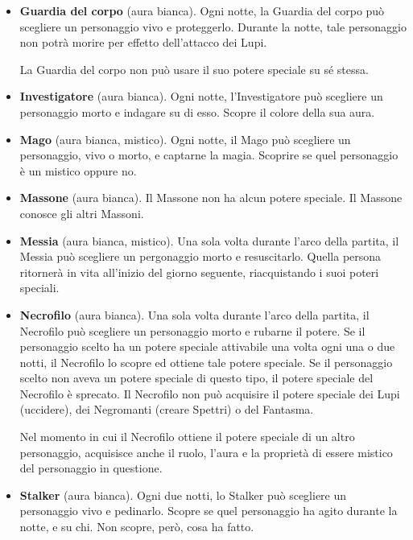 \documentclass[a4paper,10pt]{article}
\begin{document}
\begin{itemize}
 \item {\bf Guardia del corpo} (aura bianca). Ogni notte, la Guardia del corpo può scegliere un personaggio vivo e proteggerlo. Durante la notte, tale personaggio non potrà morire per effetto dell'attacco dei Lupi.
 
 La Guardia del corpo non può usare il suo potere speciale su sé stessa.
 
 \item {\bf Investigatore} (aura bianca). Ogni notte, l'Investigatore può scegliere un personaggio morto e indagare su di esso. Scopre il colore della sua aura.

 \item {\bf Mago} (aura bianca, mistico). Ogni notte, il Mago può scegliere un personaggio, vivo o morto, e captarne la magia. Scoprire se quel personaggio è un mistico oppure no.
 
 \item {\bf Massone} (aura bianca). Il Massone non ha alcun potere speciale. Il Massone conosce gli altri Massoni.
 
 \item {\bf Messia} (aura bianca, mistico). Una sola volta durante l'arco della partita, il Messia può scegliere un pergonaggio morto e resuscitarlo. Quella persona ritornerà in vita all'inizio del giorno seguente, riacquistando i suoi poteri speciali.


 \item {\bf Necrofilo} (aura bianca). Una sola volta durante l'arco della partita, il Necrofilo può scegliere un personaggio morto e rubarne il potere. 
 Se il personaggio scelto ha un potere speciale attivabile una volta ogni una o due notti, il Necrofilo lo scopre ed ottiene tale potere speciale.
 Se il personaggio scelto non aveva un potere speciale di questo tipo, il potere speciale del Necrofilo è sprecato.
 Il Necrofilo non può acquisire il potere speciale dei Lupi (uccidere), dei Negromanti (creare Spettri) o del Fantasma.
 
 Nel momento in cui il Necrofilo ottiene il potere speciale di un altro personaggio, acquisisce anche il ruolo, l'aura e la proprietà di essere mistico del personaggio in questione.

 \item {\bf Stalker} (aura bianca). Ogni due notti, lo Stalker può scegliere un personaggio vivo e pedinarlo. Scopre se quel personaggio ha agito durante la notte, e su chi. Non scopre, però, cosa ha fatto.
 

\end{itemize}
\end{document}
